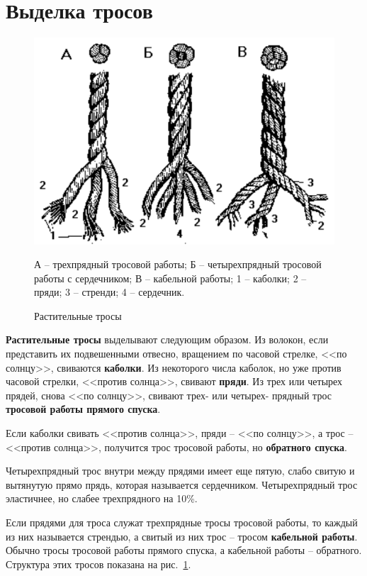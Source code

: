 \documentclass[a4paper, 12pt, twoside, final]{scrbook}
\begin{document}
\section{Выделка тросов}

\begin{figure}
   \centering
   \includegraphics[scale=0.9]{55_Rastitelnye_trosy} %
   \caption{Растительные тросы}
   \label{fig:55}
   \centering \small
   А \--- трехпрядный тросовой работы;
   Б \--- четырехпрядный тросовой работы с сердечником;
   В \--- кабельной работы;
   1 \--- каболки; 2 \--- пряди; 3 \--- стренди; 4 \--- сердечник.
\end{figure}

\textbf{Растительные тросы} выделывают следующим образом. Из волокон, если представить их подвешенными отвесно, вращением по часовой стрелке, <<по солнцу>>, свиваются \textbf{каболки}. Из некоторого числа каболок, но уже против часовой стрелки, <<против солнца>>, свивают \textbf{пряди}. Из трех или четырех прядей, снова <<по солнцу>>, свивают трех- или четырех- прядный трос \textbf{тросовой работы прямого спуска}.

Если каболки свивать <<против солнца>>, пряди \--- <<по солнцу>>, а трос \--- <<против солнца>>, получится трос тросовой работы, но \textbf{обратного спуска}.

Четырехпрядный трос внутри между прядями имеет еще пятую, слабо свитую и вытянутую прямо прядь, которая называется сердечником. Четырехпрядный трос эластичнее, но слабее трехпрядного на 10\%.

Если прядями для троса служат трехпрядные тросы тросовой работы, то каждый из них называется стрендью, а свитый из них трос \--- тросом \textbf{кабельной работы}. Обычно тросы тросовой работы прямого спуска, а кабельной работы \--- обратного. Структура этих тросов показана на рис.~\ref{fig:55}.
\end{document}
